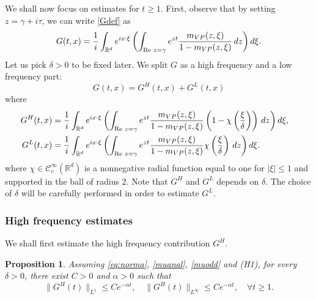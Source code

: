 \documentclass[11pt]{amsart}
\numberwithin{equation}{section}
\newtheorem{prop}{Proposition}[section]
\begin{document}
   
   We shall now focus on estimates for $t \geq 1$. First, observe that by setting $z= \gamma + i \tau$,  we can write \eqref{Gdef} as
$$ G (t,x)={ 1 \over i} \int_{\mathbb{R}^d} e^{i x \cdot \xi} \left( \int_{\operatorname{Re}\, z= \gamma }   e^{z t } { m_{VP}(z,\xi) \over 1-m_{VP}(z, \xi)}
 \, dz \right) d \xi.$$
 Let us pick $\delta>0$ to be fixed later.
   We split $G$ as  a high frequency and a low frequency part:
   \begin{equation}
   \label{Gsplit1}
    G (t,x)= G^H(t,x)+ G^L(t,x)
   \end{equation}
   where
   \begin{align}
  \label{GHdef}  G^H(t,x) & = { 1 \over i} \int_{\mathbb{R}^d} e^{i x \cdot \xi} \left( \int_{\operatorname{Re}\, z= \gamma }   e^{z t } { m_{VP}(z,\xi) \over 1-m_{VP}(z, \xi)}
   \left(1- \chi\left({\xi \over \delta}\right) \right)
 \, dz \right) d \xi, \quad \\
 \label{GLdef} G^L(t,x) & = { 1 \over i} \int_{\mathbb{R}^d} e^{i x \cdot \xi} \left( \int_{\operatorname{Re}\, z= \gamma }   e^{z t } { m_{VP}(z,\xi) \over 1-m_{VP}(z, \xi)}
   \chi\left({\xi \over \delta} \right) \, dz \right) d \xi.
   \end{align}
   where $\chi \in \mathcal{C}^\infty_{c}(\mathbb{R}^d)$ is a nonnegative radial  function equal to one for $| \xi| \leq 1$
    and supported in the  ball of radius $2$. Note that $G^H$ and $G^L$ depends on $\delta$. The choice of $\delta$
     will be carefully performed in order to estimate $G^L$.

\subsubsection{High frequency estimates}
 
    We shall first estimate the high frequency contribution $G^H$. 

  \begin{prop}
  \label{lemGH}
  Assuming \eqref{eq:norma}, \eqref{muanal}, \eqref{muodd} and (H1), 
  for every $\delta>0$, 
   there exist $C>0$ and $\alpha>0$ such that 
   $$ \|G^H(t) \|_{L^1} \leq C e^{- \alpha t}, \quad  \|G^H(t) \|_{L^\infty} \leq  C e^{- \alpha t}, \quad \forall t \geq 1.$$
  \end{prop}
 
\end{document}
